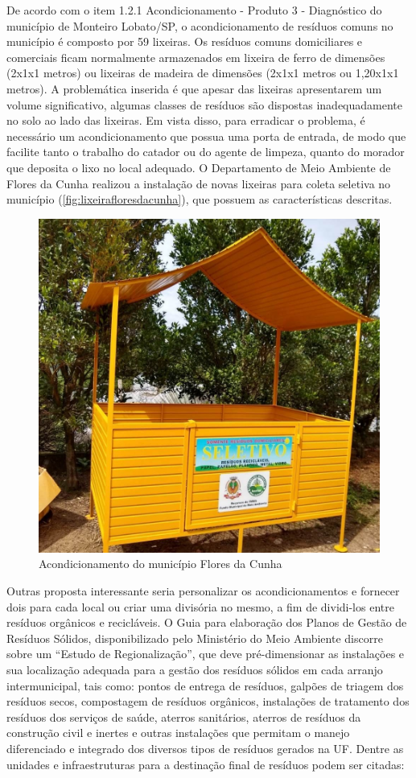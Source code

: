 De acordo com o item 1.2.1 Acondicionamento - Produto 3 - Diagnóstico do município de Monteiro Lobato/SP, o acondicionamento de resíduos comuns no município é composto por 59 lixeiras. Os resíduos comuns domiciliares e comerciais ficam normalmente armazenados em lixeira de ferro de dimensões (2x1x1 metros) ou lixeiras de madeira de dimensões (2x1x1 metros ou 1,20x1x1 metros). A problemática inserida é que apesar das lixeiras apresentarem um volume significativo, algumas classes de resíduos são dispostas inadequadamente no solo ao lado das lixeiras. Em vista disso, para erradicar o problema, é necessário um acondicionamento que possua uma porta de entrada, de modo que facilite tanto o trabalho do catador ou do agente de limpeza, quanto do morador que deposita o lixo no local adequado. O Departamento de Meio Ambiente de Flores da Cunha realizou a instalação de novas lixeiras para coleta seletiva no município (\autoref{fig:lixeirafloresdacunha}), que possuem as características descritas.   

\begin{figure}[h]
	\centering
	\includegraphics[width=0.5\linewidth]{produtos/prodquatro/lixeira_floresdacunha}
	\caption{Acondicionamento do município Flores da Cunha}
	\label{fig:lixeirafloresdacunha}
\end{figure}

Outras proposta interessante seria personalizar os acondicionamentos e fornecer dois para cada local ou criar uma divisória no mesmo, a fim de dividi-los entre resíduos orgânicos e recicláveis.
O Guia para elaboração dos Planos de Gestão de Resíduos Sólidos, disponibilizado pelo Ministério do Meio Ambiente discorre sobre um “Estudo de Regionalização”, que deve pré-dimensionar as instalações e sua localização adequada para a gestão dos resíduos sólidos em cada arranjo intermunicipal, tais como: pontos de entrega de resíduos, galpões de triagem dos resíduos secos, compostagem de resíduos orgânicos, instalações de tratamento dos resíduos dos serviços de saúde, aterros sanitários, aterros de resíduos da construção civil e inertes e outras instalações que permitam o manejo diferenciado e integrado dos diversos tipos de resíduos gerados na UF. Dentre as unidades e infraestruturas para a destinação final de resíduos podem ser citadas: 


